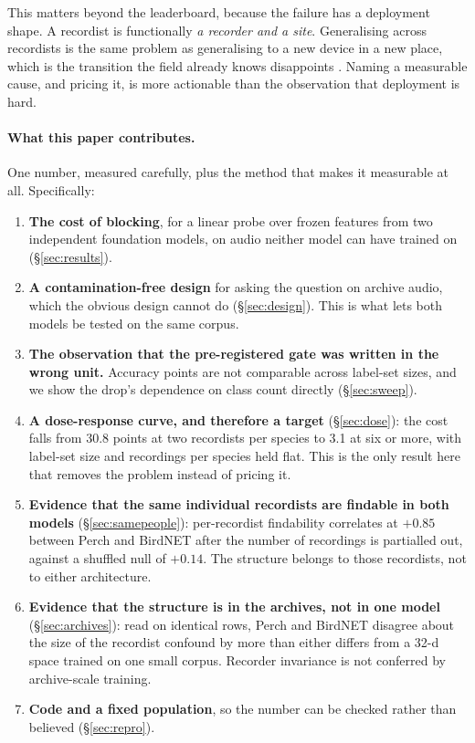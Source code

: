 \documentclass[10pt,twocolumn,a4paper]{article}
\begin{document}
This matters beyond the leaderboard, because the failure has a deployment shape. A recordist
is functionally \emph{a recorder and a site}. Generalising across recordists is the same
problem as generalising to a new device in a new place, which is the transition the field
already knows disappoints \citep{perch2}. Naming a measurable cause, and pricing it, is more
actionable than the observation that deployment is hard.

\paragraph{What this paper contributes.} One number, measured carefully, plus the method that
makes it measurable at all. Specifically:

\begin{enumerate}
  \item \textbf{The cost of blocking}, for a linear probe over frozen features from two
    independent foundation models, on audio neither model can have trained on
    (\S\ref{sec:results}).
  \item \textbf{A contamination-free design} for asking the question on archive audio, which
    the obvious design cannot do (\S\ref{sec:design}). This is what lets both models be
    tested on the same corpus.
  \item \textbf{The observation that the pre-registered gate was written in the wrong unit.}
    Accuracy points are not comparable across label-set sizes, and we show the drop's
    dependence on class count directly (\S\ref{sec:sweep}).
  \item \textbf{A dose-response curve, and therefore a target} (\S\ref{sec:dose}): the cost falls
    from 30.8 points at two recordists per species to 3.1 at six or more, with label-set size and
    recordings per species held flat. This is the only result here that removes the problem
    instead of pricing it.
  \item \textbf{Evidence that the same individual recordists are findable in both models}
    (\S\ref{sec:samepeople}): per-recordist findability correlates at $+0.85$ between Perch and
    BirdNET after the number of recordings is partialled out, against a shuffled null of $+0.14$.
    The structure belongs to those recordists, not to either architecture.
  \item \textbf{Evidence that the structure is in the archives, not in one model}
    (\S\ref{sec:archives}): read on identical rows, Perch and BirdNET disagree about the size
    of the recordist confound by more than either differs from a 32-d space trained on one
    small corpus. Recorder invariance is not conferred by archive-scale training.
  \item \textbf{Code and a fixed population}, so the number can be checked rather than
    believed (\S\ref{sec:repro}).
\end{enumerate}
\end{document}
